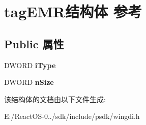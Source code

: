 \hypertarget{structtag_e_m_r}{}\section{tag\+E\+M\+R结构体 参考}
\label{structtag_e_m_r}
\subsection*{Public 属性}
\begin{DoxyCompactItemize}
\item 
\mbox{\label{structtag_e_m_r_a31c6982ee1dc1973f1519dd175038b8c}} 
D\+W\+O\+RD {\bfseries i\+Type}
\item 
\mbox{\label{structtag_e_m_r_adc88689b4254a170f947bb581eb4b671}} 
D\+W\+O\+RD {\bfseries n\+Size}
\end{DoxyCompactItemize}


该结构体的文档由以下文件生成\+:\begin{DoxyCompactItemize}
\item 
E\+:/\+React\+O\+S-\/0../sdk/include/psdk/wingdi.\+h\end{DoxyCompactItemize}
